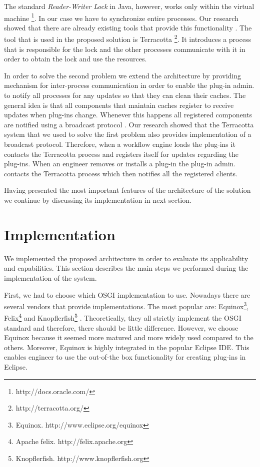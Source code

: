The standard \textit{Reader-Writer Lock} in Java, however, works only within the virtual machine \footnote{http://docs.oracle.com/}. In our case we have to synchronize entire processes. Our research showed that there are already existing tools that provide this functionality \cite{hernane2012dynamic}. The tool that is used in the proposed solution is Terracotta \footnote{http://terracotta.org/}. It introduces a process that is responsible for the lock and the other processes communicate with it in order to obtain the lock and use the resources.

In order to solve the second problem we extend the architecture by providing mechanism for inter-process communication in order to enable the plug-in admin. to notify all processes for any updates so that they can clean their caches. The general idea is that all components that maintain caches register to receive updates when plug-ins change. Whenever this happens all registered components are notified using a broadcast protocol \cite{joseph1988reliable}. Our research showed that the Terracotta system that we used to solve the first problem also provides implementation of a broadcast protocol. Therefore, when a workflow engine loads the plug-ins it contacts the Terracotta process and registers itself for updates regarding the plug-ins. When an engineer removes or installs a plug-in the plug-in admin. contacts the Terracotta process which then notifies all the registered clients.

Having presented the most important features of the architecture of the solution we continue by discussing its implementation in next section. 


\section{Implementation}
\label{sec:implPlugin}

We implemented the proposed architecture in order to evaluate its applicability and capabilities. This section describes the main steps we performed during the implementation of the system.

First, we had to choose which OSGI implementation to use. Nowadays there are several vendors that provide implementations. The most popular are: Equinox\footnote{Equinox. http://www.eclipse.org/equinox}, Felix\footnote{Apache felix. http://felix.apache.org} and Knopflerfish\footnote{Knopflerfish. http://www.knopflerfish.org} \cite{tavares2008gentle}. Theoretically, they all strictly implement the OSGI standard and therefore, there should be little difference. However, we choose Equinox because it seemed more matured and more widely used compared to the others. Moreover, Equinox is highly integrated in the popular Eclipse IDE. This enables engineer to use the out-of-the box functionality for creating plug-ins in Eclipse.

